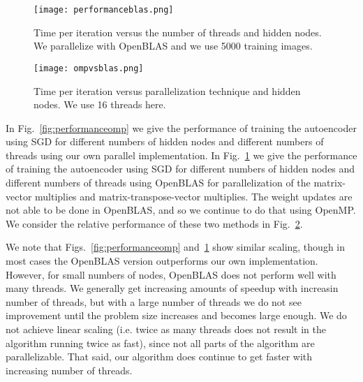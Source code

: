 \begin{figure}[h]
\centering
\texttt{[image: performanceblas.png]}
\caption{Time per iteration versus the number of threads and hidden nodes. We parallelize with OpenBLAS and we use 5000 training images.}
\label{fig:performanceblas}
\end{figure}



\begin{figure}[h]
\centering
\texttt{[image: ompvsblas.png]}
\caption{Time per iteration versus parallelization technique and hidden nodes. We use 16 threads here.}
\label{fig:ompvsblas}
\end{figure}

In  Fig.~\ref{fig:performanceomp} we give the performance of training the autoencoder using SGD for different numbers of hidden nodes and different numbers of threads using our own parallel implementation.
In  Fig.~\ref{fig:performanceblas} we give the performance of training the autoencoder using SGD for different numbers of hidden nodes and different numbers of threads using OpenBLAS for parallelization of the matrix-vector multiplies and
matrix-transpose-vector multiplies. The weight updates are not able to be done in OpenBLAS, and so we continue to do that using OpenMP.
We consider the relative performance of these two methods in Fig.~\ref{fig:ompvsblas}.

We note that Figs.~\ref{fig:performanceomp} and~\ref{fig:performanceblas} show similar scaling, though in most cases the OpenBLAS version outperforms our own implementation. However, for small numbers of nodes, OpenBLAS does not perform well with many threads.
We generally get increasing amounts of speedup with increasin number of threads, but with a large number of threads we do not see improvement until the problem size increases and becomes large enough. We do not achieve linear scaling (i.e. twice as many threads does not result in the algorithm running twice as fast), since not all parts of the algorithm are parallelizable. That said, our algorithm does continue to get faster with increasing number of threads.
